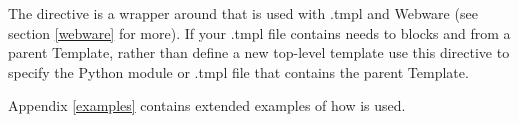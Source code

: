 The  directive is a wrapper around
 that is used with .tmpl and Webware
(see section \ref{webware} for more). If your .tmpl file contains needs to
 blocks and  from a parent Template, rather than
define a new top-level template use this directive to specify the Python module
or .tmpl file that contains the parent Template. 


Appendix \ref{examples} contains extended examples of how  is
used.



